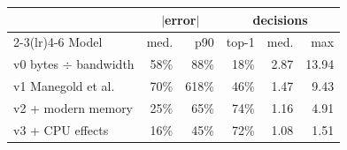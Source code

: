 \begin{tabular}{lrrrrr}
\toprule
 & \multicolumn{2}{c}{$|$error$|$} & \multicolumn{3}{c}{decisions} \\
\cmidrule(lr){2-3}\cmidrule(lr){4-6}
Model & med. & p90 & top-1 & med. & max \\
\midrule
v0 bytes $\div$ bandwidth & 58\% & 88\% & 18\% & 2.87 & 13.94 \\
v1 Manegold et al. & 70\% & 618\% & 46\% & 1.47 & 9.43 \\
v2 + modern memory & 25\% & 65\% & 74\% & 1.16 & 4.91 \\
v3 + CPU effects & 16\% & 45\% & 72\% & 1.08 & 1.51 \\
\bottomrule
\end{tabular}
